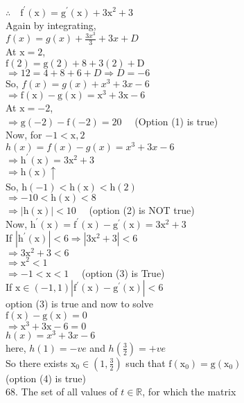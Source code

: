 \documentclass[10pt]{article}
\begin{document}
\(\therefore \quad \mathrm{f}^{\prime}(\mathrm{x})=\mathrm{g}^{\prime}(\mathrm{x})+3 \mathrm{x}^{2}+3\)\\
Again by integrating,\\
\(f(x)=g(x)+\frac{3 x^{3}}{3}+3 x+D\)\\
At \(\mathrm{x}=2\),\\
\(\mathrm{f}(2)=\mathrm{g}(2)+8+3(2)+\mathrm{D}\)\\
\(\Rightarrow 12=4+8+6+D \Rightarrow D=-6\)\\
So, \(f(x)=g(x)+x^{3}+3 x-6\)\\
\(\Rightarrow \mathrm{f}(\mathrm{x})-\mathrm{g}(\mathrm{x})=\mathrm{x}^{3}+3 \mathrm{x}-6\)\\
At \(\mathrm{x}=-2\),\\
\(\Rightarrow \mathrm{g}(-2)-\mathrm{f}(-2)=20 \quad\) (Option (1) is true)\\
Now, for \(-1<\mathrm{x}, 2\)\\
\(h(x)=f(x)-g(x)=x^{3}+3 x-6\)\\
\(\Rightarrow \mathrm{h}^{\prime}(\mathrm{x})=3 \mathrm{x}^{2}+3\)\\
\(\Rightarrow \mathrm{h}(\mathrm{x}) \uparrow\)\\
So, \(\mathrm{h}(-1)<\mathrm{h}(\mathrm{x})<\mathrm{h}(2)\)\\
\(\Rightarrow-10<\mathrm{h}(\mathrm{x})<8\)\\
\(\Rightarrow|\mathrm{h}(\mathrm{x})|<10 \quad\) (option (2) is NOT true)\\
Now, \(\mathrm{h}^{\prime}(\mathrm{x})=\mathrm{f}^{\prime}(\mathrm{x})-\mathrm{g}^{\prime}(\mathrm{x})=3 \mathrm{x}^{2}+3\)\\
If \(\left|\mathrm{h}^{\prime}(\mathrm{x})\right|<6 \Rightarrow\left|3 \mathrm{x}^{2}+3\right|<6\)\\
\(\Rightarrow 3 \mathrm{x}^{2}+3<6\)\\
\(\Rightarrow \mathrm{x}^{2}<1\)\\
\(\Rightarrow-1<\mathrm{x}<1 \quad\) (option (3) is True)\\
If \(\mathrm{x} \in(-1,1)\left|\mathrm{f}^{\prime}(\mathrm{x})-\mathrm{g}^{\prime}(\mathrm{x})\right|<6\)\\
option (3) is true and now to solve\\
\(\mathrm{f}(\mathrm{x})-\mathrm{g}(\mathrm{x})=0\)\\
\(\Rightarrow \mathrm{x}^{3}+3 \mathrm{x}-6=0\)\\
\(h(x)=x^{3}+3 x-6\)\\
here, \(h(1)=-v e\) and \(h\left(\frac{3}{2}\right)=+v e\)\\
So there exists \(\mathrm{x}_{0} \in\left(1, \frac{3}{2}\right)\) such that \(\mathrm{f}\left(\mathrm{x}_{0}\right)=\mathrm{g}\left(\mathrm{x}_{0}\right)\)\\
(option (4) is true)\\
68. The set of all values of \(t \in \mathbb{R}\), for which the matrix
\end{document}
